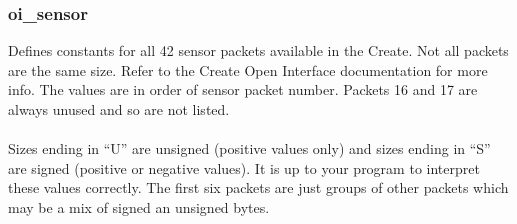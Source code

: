 \documentclass {article}
\begin{document}
\subsubsection {oi\_sensor} \hypertarget{oisensor}{}
Defines constants for all 42 sensor packets available in the Create.  Not all packets are the same
size.  Refer to the Create Open Interface documentation for more info.  The values are in order of
sensor packet number.  Packets 16 and 17 are always unused and so are not listed. \\
\\
Sizes ending in ``U'' are unsigned (positive values only) and sizes ending in ``S'' are signed
(positive or negative values).  It is up to your program to interpret these values correctly.  The
first six packets are just groups of other packets which may be a mix of signed an unsigned bytes.
\end{document}
